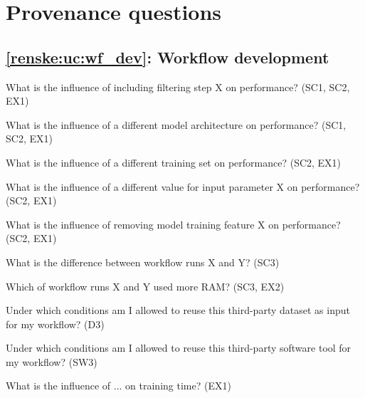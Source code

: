 \section{Provenance questions}\label{renske:sup:provquestions}




\subsection*{\ref{renske:uc:wf_dev}: Workflow development}

\begin{provquestions}
    \item What is the influence of including filtering step X on performance? (SC1, SC2, EX1)
    \item What is the influence of a different model architecture on performance? (SC1, SC2, EX1)
    \item What is the influence of a different training set on performance? (SC2, EX1)
    \item What is the influence of a different value for input parameter X on performance? (SC2, EX1)
    \item What is the influence of removing model training feature X on performance? (SC2, EX1)
    \item What is the difference between workflow runs X and Y? (SC3)
    \item Which of workflow runs X and Y used more RAM? (SC3, EX2)
    \item Under which conditions am I allowed to reuse this third-party dataset as input for my workflow? (D3)
    \item Under which conditions am I allowed to reuse this third-party software tool for my workflow? (SW3)
    \item What is the influence of ... on training time? (EX1)
\end{provquestions}

